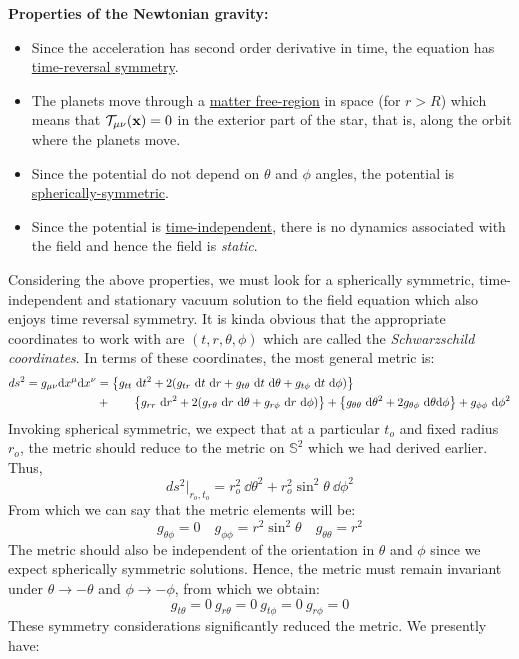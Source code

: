 \textbf{Properties of the Newtonian gravity:}\\
\begin{itemize}
    \item Since the acceleration has second order derivative in time, the equation has \underline{time-reversal symmetry}.
    \item The planets move through a \underline{matter free-region} in space (for $r>R$) which means that $\mathcal T_{\mu\nu}(\vb{x})=0$ in the exterior part of the star, that is, along the orbit where the planets move. 
    \item Since the potential do not depend on $\theta$ and $\phi$ angles, the potential is \underline{spherically-symmetric}.
    \item Since the potential is \underline{time-independent}, there is no dynamics associated with the field and hence the field is \textit{static}. 
\end{itemize}
Considering the above properties, we must look for a spherically symmetric, time-independent and stationary vacuum solution to the field equation which also enjoys time reversal symmetry. It is kinda obvious that the appropriate coordinates to work with are $(t,r,\theta,\phi)$ which are called the \textit{Schwarzschild coordinates}. In terms of these coordinates, the most general metric is:
\begin{align*}
    ds^2 = g_{\mu\nu} \dd x^\mu \dd x^\nu &= \qty{g_{tt}\ \dd t^2  +2(g_{tr}\ \dd t\ \dd r +g_{t\theta}\ \dd t\ \dd \theta+g_{t\phi}\ \dd t\ \dd \phi ) } \\
    &+\qquad \qty{g_{rr}\ \dd r^2  +2(g_{r\theta}\ \dd r\ \dd \theta+g_{r\phi}\ \dd r\ \dd \phi) } +  \qty{g_{\theta\theta}\ \dd \theta^2 + 2g_{\theta\phi}\ \dd \theta \dd \phi} + g_{\phi\phi}\ \dd \phi^2
\end{align*}
Invoking spherical symmetric, we expect that at a particular $t_o$ and fixed radius $r_o$, the metric should reduce to the metric on $\mathbb{S}^2$ which we had derived earlier. Thus, 
$$ds^2\Big|_{r_o,t_o} = r_o^2\ \dd \theta^2 + r_o^2\sin^2\theta\ \dd \phi^2$$
From which we can say that the metric elements will be: $$ g_{\theta\phi} = 0\quad g_{\phi\phi}= r^2\sin^2\theta\quad  g_{\theta\theta} = r^2 $$
The metric should also be independent of the orientation in $\theta$ and $\phi$ since we expect spherically symmetric solutions. Hence, the metric must remain invariant under $\theta\to -\theta$ and $\phi \to -\phi$, from which we obtain:
$$g_{t\theta} = 0 \ g_{r\theta}=0\ g_{t\phi} = 0 \ g_{r\phi}=0 $$
These symmetry considerations significantly reduced the metric. We presently have:
